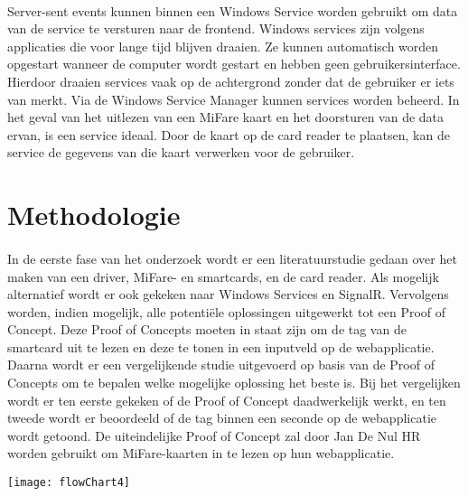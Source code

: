 \paragraph{}
Server-sent events kunnen binnen een Windows Service worden gebruikt om data van de service te versturen naar de frontend.
Windows services zijn volgens \textcite{MicrosoftWS} applicaties die voor lange tijd blijven draaien. Ze kunnen automatisch worden opgestart wanneer de computer wordt gestart en hebben geen gebruikersinterface. Hierdoor draaien services vaak op de achtergrond zonder dat de gebruiker er iets van merkt. Via de Windows Service Manager kunnen services worden beheerd. In het geval van het uitlezen van een MiFare kaart en het doorsturen van de data ervan, is een service ideaal. Door de kaart op de card reader te plaatsen, kan de service de gegevens van die kaart verwerken voor de gebruiker.

\bigskip
\section{Methodologie}%
\label{sec:methodologie}
\paragraph{}
In de eerste fase van het onderzoek wordt er een literatuurstudie gedaan over het maken van een driver, MiFare- en smartcards, en de card reader. Als mogelijk alternatief wordt er ook gekeken naar Windows Services en SignalR. Vervolgens worden, indien mogelijk, alle potentiële oplossingen uitgewerkt tot een Proof of Concept. Deze Proof of Concepts moeten in staat zijn om de tag van de smartcard uit te lezen en deze te tonen in een inputveld op de webapplicatie.
Daarna wordt er een vergelijkende studie uitgevoerd op basis van de Proof of Concepts om te bepalen welke mogelijke oplossing het beste is. Bij het vergelijken wordt er ten eerste gekeken of de Proof of Concept daadwerkelijk werkt, en ten tweede wordt er beoordeeld of de tag binnen een seconde op de webapplicatie wordt getoond.
De uiteindelijke Proof of Concept zal door Jan De Nul HR worden gebruikt om MiFare-kaarten in te lezen op hun webapplicatie.

\begin{center}
    \texttt{[image: flowChart4]}
\end{center}

\bigskip
